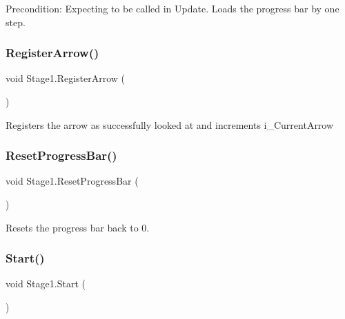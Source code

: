 Precondition\+: Expecting to be called in Update. Loads the progress bar by one step. 

\mbox{\label{class_stage1_aa992bad0fdb8df10f5ea6689ef8863ae}} 
\subsubsection{\texorpdfstring{Register\+Arrow()}{RegisterArrow()}}
{\footnotesize\ttfamily void Stage1.\+Register\+Arrow (\begin{DoxyParamCaption}{ }\end{DoxyParamCaption})\hspace{0.3cm}{\ttfamily [private]}}



Registers the arrow as successfully looked at and increments {\ttfamily i\+\_\+\+Current\+Arrow} 

\mbox{\label{class_stage1_ac86ffd4a366e400042b42869b9282594}} 
\subsubsection{\texorpdfstring{Reset\+Progress\+Bar()}{ResetProgressBar()}}
{\footnotesize\ttfamily void Stage1.\+Reset\+Progress\+Bar (\begin{DoxyParamCaption}{ }\end{DoxyParamCaption})\hspace{0.3cm}{\ttfamily [private]}}



Resets the progress bar back to 0. 

\mbox{\label{class_stage1_a22cb4953258834766118cccf6637bf6e}} 
\subsubsection{\texorpdfstring{Start()}{Start()}}
{\footnotesize\ttfamily void Stage1.\+Start (\begin{DoxyParamCaption}{ }\end{DoxyParamCaption})\hspace{0.3cm}{\ttfamily [private]}}

